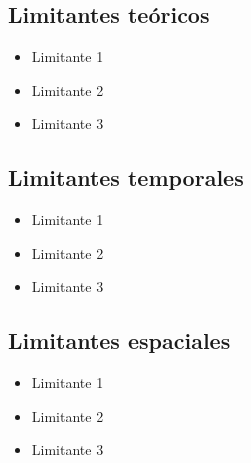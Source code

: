 \subsection{Limitantes teóricos}

\begin{itemize}
    \item Limitante 1
    \item Limitante 2
    \item Limitante 3
\end{itemize}

\subsection{Limitantes temporales}

\begin{itemize}
    \item Limitante 1
    \item Limitante 2
    \item Limitante 3
\end{itemize}

\subsection{Limitantes espaciales}

\begin{itemize}
    \item Limitante 1
    \item Limitante 2
    \item Limitante 3
\end{itemize}
